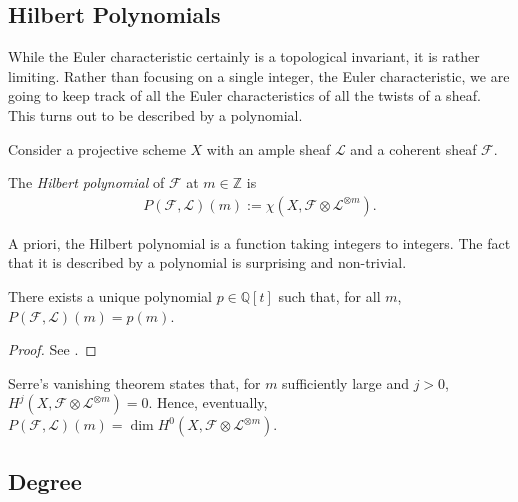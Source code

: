 \documentclass[12pt]{ociamthesis}  %
\begin{document}
\subsection{Hilbert Polynomials}

While the Euler characteristic certainly is a topological invariant,
it is rather limiting. Rather than focusing on a single integer,
the Euler characteristic,
we are going to keep track of all the Euler characteristics of all
the twists of a sheaf. This turns out to be described by a polynomial.

Consider a projective scheme $X$ with an ample sheaf $\mathcal L$
and a coherent sheaf $\mathcal F$.

\begin{definition}
  The \emph{Hilbert polynomial} of $\mathcal F$ at $m\in\mathbb{Z}$
  is
  \begin{align*}
    P(\mathcal F,\mathcal L)(m) := \chi(X,\mathcal F \otimes \mathcal L^{\otimes m}).
  \end{align*}
\end{definition}

A priori, the Hilbert polynomial is a function taking integers to
integers. The fact that it is described by a polynomial is
surprising and non-trivial.

\begin{lemma}
  There exists a unique polynomial $p\in\mathbb{Q}[t]$ such that,
  for all $m$, $P(\mathcal F,\mathcal L)(m) = p(m)$.
  \begin{proof}
    See \cite[Lemma 1.2.1]{huybrechts2010}.
  \end{proof}
\end{lemma}

\begin{example}
  \missingexample
\end{example}

Serre's vanishing theorem \missingcitation states that,
for $m$ sufficiently large and $j>0$,
$H^j(X,\mathcal F\otimes\mathcal L^{\otimes m})=0$. Hence,
eventually,
$P(\mathcal F,\mathcal L)(m) = \dim H^0(X,\mathcal F\otimes \mathcal L^{\otimes m})$.

\begin{lemma}
\end{lemma}

\subsection{Degree}
\end{document}
